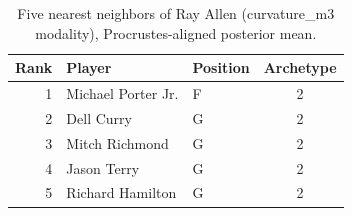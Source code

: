 \begin{table}[htbp]
  \centering\small
  \begin{tabular}{rllc}
    \toprule
    Rank & Player & Position & Archetype \\
    \midrule
    1 & Michael Porter Jr. & F & 2 \\
    2 & Dell Curry & G & 2 \\
    3 & Mitch Richmond & G & 2 \\
    4 & Jason Terry & G & 2 \\
    5 & Richard Hamilton & G & 2 \\
    \bottomrule
  \end{tabular}
  \caption{Five nearest neighbors of Ray Allen (curvature_m3 modality), Procrustes-aligned posterior mean.}
  \label{tab:Ray_Allen_neighbors_curvature_m3}
\end{table}

